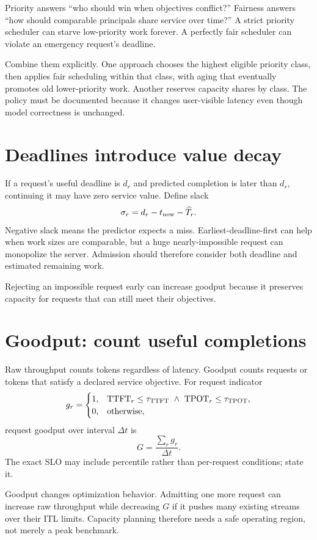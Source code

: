 Priority answers ``who should win when objectives conflict?'' Fairness answers ``how
should comparable principals share service over time?'' A strict priority scheduler
can starve low-priority work forever. A perfectly fair scheduler can violate an
emergency request's deadline.

Combine them explicitly. One approach chooses the highest eligible priority class,
then applies fair scheduling within that class, with aging that eventually promotes
old lower-priority work. Another reserves capacity shares by class. The policy must be
documented because it changes user-visible latency even though model correctness is
unchanged.

\section{Deadlines introduce value decay}

If a request's useful deadline is $d_r$ and predicted completion is later than
$d_r$, continuing it may have zero service value. Define slack
\[
\sigma_r=d_r-t_{\rm now}-\widehat T_r.
\]
Negative slack means the predictor expects a miss. Earliest-deadline-first can help
when work sizes are comparable, but a huge nearly-impossible request can monopolize
the server. Admission should therefore consider both deadline and estimated remaining
work.

Rejecting an impossible request early can increase goodput because it preserves
capacity for requests that can still meet their objectives.

\section{Goodput: count useful completions}

Raw throughput counts tokens regardless of latency. Goodput counts requests or tokens
that satisfy a declared service objective. For request indicator
\[
g_r =
\begin{cases}
1,&\mathrm{TTFT}_r\le\tau_{\rm TTFT}\ \land\
   \mathrm{TPOT}_r\le\tau_{\rm TPOT},\\
0,&\text{otherwise},
\end{cases}
\]
request goodput over interval $\Delta t$ is
\[
G=\frac{\sum_r g_r}{\Delta t}.
\]
The exact SLO may include percentile rather than per-request conditions; state it.

Goodput changes optimization behavior. Admitting one more request can increase raw
throughput while decreasing $G$ if it pushes many existing streams over their ITL
limits. Capacity planning therefore needs a safe operating region, not merely a peak
benchmark.

